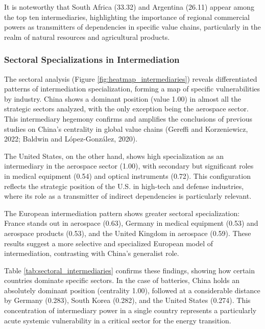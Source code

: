 \documentclass[final,1p,times,authoryear]{elsarticle}
\begin{document}
It is noteworthy that South Africa (33.32) and Argentina (26.11) appear among the top ten intermediaries, highlighting the importance of regional commercial powers as transmitters of dependencies in specific value chains, particularly in the realm of natural resources and agricultural products.

\subsubsection{Sectoral Specializations in Intermediation}

The sectoral analysis (Figure \ref{fig:heatmap_intermediaries}) reveals differentiated patterns of intermediation specialization, forming a map of specific vulnerabilities by industry. China shows a dominant position (value 1.00) in almost all the strategic sectors analyzed, with the only exception being the aerospace sector. This intermediary hegemony confirms and amplifies the conclusions of previous studies on China's centrality in global value chains (Gereffi and Korzeniewicz, 2022; Baldwin and López-González, 2020).

The United States, on the other hand, shows high specialization as an intermediary in the aerospace sector (1.00), with secondary but significant roles in medical equipment (0.54) and optical instruments (0.72). This configuration reflects the strategic position of the U.S. in high-tech and defense industries, where its role as a transmitter of indirect dependencies is particularly relevant.

The European intermediation pattern shows greater sectoral specialization: France stands out in aerospace (0.63), Germany in medical equipment (0.53) and aerospace products (0.53), and the United Kingdom in aerospace (0.59). These results suggest a more selective and specialized European model of intermediation, contrasting with China's generalist role.

Table \ref{tab:sectoral_intermediaries} confirms these findings, showing how certain countries dominate specific sectors. In the case of batteries, China holds an absolutely dominant position (centrality 1.00), followed at a considerable distance by Germany (0.283), South Korea (0.282), and the United States (0.274). This concentration of intermediary power in a single country represents a particularly acute systemic vulnerability in a critical sector for the energy transition.
\end{document}
